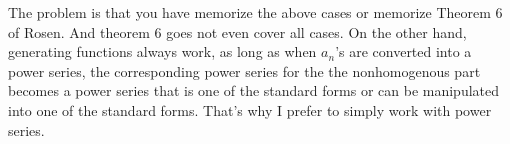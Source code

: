 The problem is that you have memorize the above cases or memorize
Theorem 6 of Rosen.
And theorem 6 goes not even cover all cases.
On the other hand, generating functions always work, as long as
when $a_n$'s are converted into a power series, the corresponding
power series for the 
the nonhomogenous part becomes a power series that is one of the
standard forms or can be manipulated into one of the standard forms.
That's why I prefer to simply work with power series.
